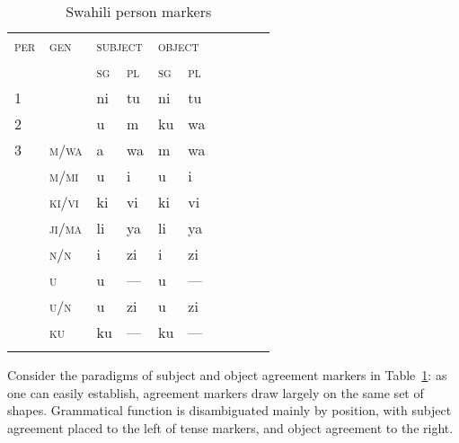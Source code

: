 \documentclass[output=paper,biblatex,babelshorthands,newtxmath,draftmode,colorlinks,citecolor=brown]{langscibook}
\begin{document}
\begin{exe}
\begin{xlist}
\begin{exe}
\begin{xlist}
\begin{table}[hbt]
  \centering
  \small
  \begin{tabular}{llllllllll}
    \lsptoprule
    \textsc{per} & \textsc{gen} & \multicolumn{2}{l}{\textsc{subject}} &
                                                                         \multicolumn{2}{l}{\textsc{object}}\\
                 & & \textsc{sg} & \textsc{pl} & \textsc{sg} & \textsc{pl}\\
    \midrule
    1	&       & ni & tu  & ni & tu\\%
    2	&       & u	 & m   & ku & wa\\%
    3	& \textsc{m/wa}  & a	 & wa  & m  & wa\\%
                 & \textsc{m/mi}	& u  & i   & u  & i \\%
                 & \textsc{ki/vi}	& ki & vi  & ki & vi \\%
                 & \textsc{ji/ma} & li & ya  & li & ya \\%
                 & \textsc{n/n} & i    & zi  & i  & zi \\%
                 & \textsc{u}     & u  & --- & u  & --- \\%
                 & \textsc{u/n}   & u  & zi  & u  & zi  \\%
                 & \textsc{ku}    & ku & --- & ku & --- \\%
    \lspbottomrule
\end{tabular}
  \caption{Swahili person markers \citep[143]{Stump93}} \label{ex:SwaPer} 

\end{table}

Consider the paradigms of  subject and object agreement
markers in Table~\ref{ex:SwaPer}: as one can easily establish,
agreement markers draw largely on the same set of shapes. Grammatical
function is disambiguated mainly by position, with subject agreement
placed to the left of tense markers, and object agreement to the
right.


\end{xlist}
\end{exe}
\end{xlist}
\end{exe}
\end{document}
